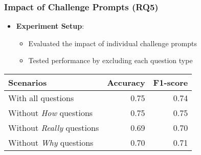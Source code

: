 \begin{frame}
  \frametitle{Impact of Challenge Prompts (RQ5)}


    \begin{itemize}
      \item \textbf{Experiment Setup}:
      \begin{itemize}
        \item Evaluated the impact of individual challenge prompts
        \item Tested performance by excluding each question type
      \end{itemize}
    \end{itemize}


    \begin{center}
      \small
      \begin{tabular}{lrr}
      \toprule
      \textbf{Scenarios} & \textbf{Accuracy} & \textbf{F1-score} \\ \midrule
      With all questions & 0.75 & 0.74 \\
      Without \textit{How} questions & 0.75 & 0.75 \\
      Without \textit{Really} questions & 0.69 & 0.70 \\ 
      Without \textit{Why} questions & 0.70 & 0.71 \\ 
      \bottomrule         
      \end{tabular}
      \label{tab:challenge_question_impact}
    \end{center}
\end{frame}


